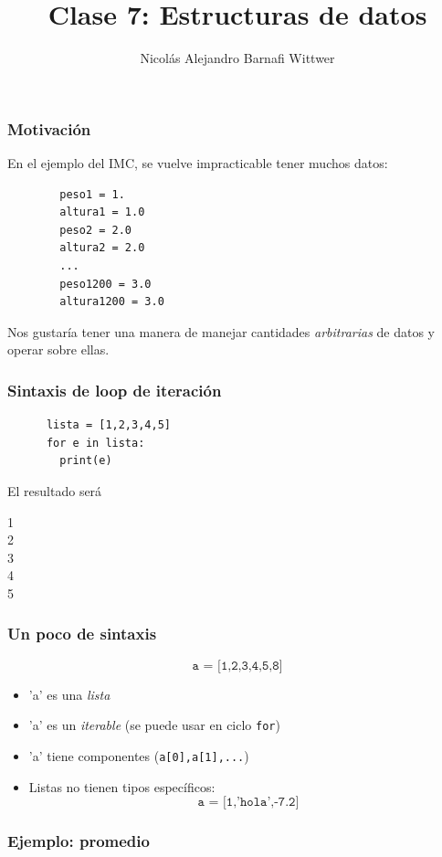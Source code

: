 \documentclass[14pt,aspectratio=169,xcolor=dvipsnames]{beamer}
\title[short title]{Clase 7: Estructuras de datos}
\subtitle{}
\author[NA Barnafi] {Nicolás Alejandro Barnafi Wittwer}
\institute[UC|CMM] 
{
    Pontificia Universidad Católica de Chile \\
    Centro de Modelamiento Matemático
}
\begin{document}
\begin{frame}
    \maketitle
\end{frame}
\begin{frame}[fragile]\frametitle{Motivación}
En el ejemplo del IMC, se vuelve impracticable tener muchos datos:
    \begin{verbatim}
        peso1 = 1.
        altura1 = 1.0
        peso2 = 2.0 
        altura2 = 2.0
        ...
        peso1200 = 3.0
        altura1200 = 3.0
    \end{verbatim}

Nos gustaría tener una manera de manejar cantidades \emph{arbitrarias} de datos y operar sobre ellas.
\end{frame}
\begin{frame}[fragile]\frametitle{Sintaxis de loop de iteración}
    \begin{verbatim}
      lista = [1,2,3,4,5]
      for e in lista:
        print(e)
    \end{verbatim}
\pause El resultado será

1\\
2\\
3\\
4\\
5
\end{frame}
\begin{frame}\frametitle{Un poco de sintaxis}
    $$ \texttt{a = [1,2,3,4,5,8]} $$
    \begin{itemize}
        \item<+-> 'a' es una \emph{lista}
        \item<+-> 'a' es un \emph{iterable} (se puede usar en ciclo \texttt{for})
        \item<+-> 'a' tiene componentes (\texttt{a[0],a[1],...})
        \item<+-> Listas no tienen tipos específicos: 
            $$ \texttt{a = [1,'hola',-7.2]} $$
    \end{itemize}
\end{frame}
\begin{frame}\frametitle{Ejemplo: promedio}
\end{frame}
\end{document}
